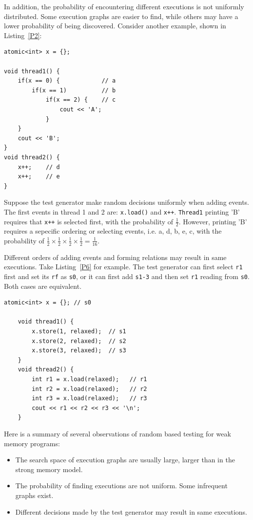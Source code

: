 In addition, the probability of encountering different executions is not uniformly distributed. Some execution graphs are easier to find, while others may have a lower probability of being discovered. Consider another example, shown in Listing~\ref{P2}:
\begin{lstlisting}[caption={P2}, label={P2}]
atomic<int> x = {};

void thread1() {
    if(x == 0) {            // a
        if(x == 1)          // b
            if(x == 2) {    // c 
                cout << 'A';
            }
    }
    cout << 'B';
}
void thread2() {
    x++;    // d
    x++;    // e
}
\end{lstlisting}

Suppose the test generator make random decisions uniformly when adding events. The first events in thread 1 and 2 are: \texttt{x.load()} and \texttt{x++}. \texttt{Thread1} printing 'B' requires that \texttt{x++} is selected first, with the probability of $\frac{1}{2}$. However, printing 'B' requires a sepecific ordering or selecting events, i.e. {a, d, b, e, c}, with the probability of $\frac{1}{2} \times \frac{1}{2}  \times \frac{1}{2}  \times \frac{1}{2} =  \frac{1}{16}$.


Different orders of adding events and forming relations may result in same executions. Take Listing~\ref{P6} for example. The test generator can first select \texttt{r1} first and set its \texttt{rf} as \texttt{s0}, or it can first add \texttt{s1-3} and then set \texttt{r1} reading from \texttt{s0}. Both cases are equivalent.

\begin{lstlisting}[caption={P6}, label={P6}]
    atomic<int> x = {}; // s0
    
    void thread1() {
        x.store(1, relaxed);  // s1 
        x.store(2, relaxed);  // s2 
        x.store(3, relaxed);  // s3 
    }
    void thread2() {
        int r1 = x.load(relaxed);   // r1
        int r2 = x.load(relaxed);   // r2 
        int r3 = x.load(relaxed);   // r3 
        cout << r1 << r2 << r3 << '\n';
    }
\end{lstlisting}



Here is a summary of several observations of random based testing for weak memory programs:
\begin{itemize}
    \item The search space of execution graphs are usually large, larger than in the strong memory model.
    \item The probability of finding executions are not uniform. Some infrequent graphs exist.
    \item Different decisions made by the test generator may result in same executions.
\end{itemize}

